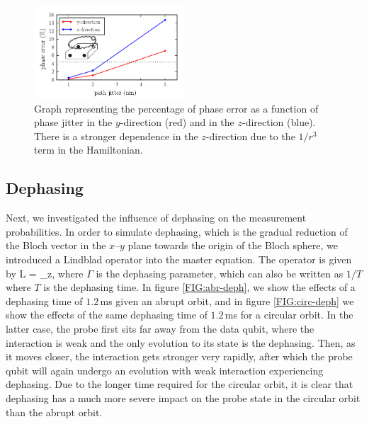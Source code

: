\begin{figure}[h]
  \centering
    \includegraphics[width=0.5\textwidth]{../Figures/path_jit.pdf}
      \caption{Graph representing the percentage of phase error as a function of phase jitter in the $y$-direction (red) and in the $z$-direction (blue). There is a stronger dependence in the $z$-direction due to the $1/r^3$ term in the Hamiltonian.}
      \label{fig:pathjitter}
\end{figure}







\subsection{Dephasing}\label{sec:dephasing}
Next, we investigated the influence of dephasing on the measurement probabilities. In order to simulate dephasing, which is the gradual reduction of the Bloch vector in the $x$--$y$ plane towards the origin of the Bloch sphere, we introduced a Lindblad operator into the master equation. The operator is given by 
\beq
L  = \sqrt{\Gamma} \sigma_z,
\eeq
where $\Gamma$ is the dephasing parameter, which can also be written as $1/T$ where $T$ is the dephasing time. In figure \ref{FIG:abr-deph}, we show the effects of a dephasing time of $1.2\, $ms given an abrupt orbit, and in figure \ref{FIG:circ-deph} we show the effects of the same dephasing time of $1.2\, $ms for a circular orbit. In the latter case, the probe first sits far away from the data qubit, where the interaction is weak and the only evolution to its state is the dephasing. Then, as it moves closer, the interaction gets stronger very rapidly, after which the probe qubit will again undergo an evolution with weak interaction experiencing dephasing. Due to the longer time required for the circular orbit, it is clear that dephasing has a much more severe impact on the probe state in the circular orbit than the abrupt orbit. 

